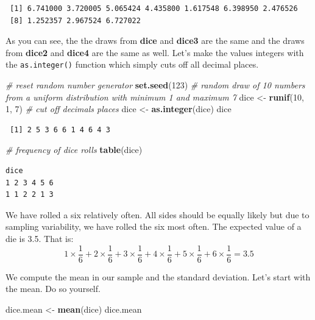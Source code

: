 \documentclass[]{article}
\newenvironment{Shaded}{\begin{snugshade}}{\end{snugshade}}
\newcommand{\CommentTok}[1]{\textcolor[rgb]{0.56,0.35,0.01}{\textit{#1}}}
\newcommand{\DecValTok}[1]{\textcolor[rgb]{0.00,0.00,0.81}{#1}}
\newcommand{\KeywordTok}[1]{\textcolor[rgb]{0.13,0.29,0.53}{\textbf{#1}}}
\newcommand{\NormalTok}[1]{#1}
\newcommand{\StringTok}[1]{\textcolor[rgb]{0.31,0.60,0.02}{#1}}
\begin{document}
\begin{verbatim}
 [1] 6.741000 3.720005 5.065424 4.435800 1.617548 6.398950 2.476526
 [8] 1.252357 2.967524 6.727022
\end{verbatim}

As you can see, the the draws from \textbf{dice} and \textbf{dice3} are the same and the draws from \textbf{dice2} and \textbf{dice4} are the same as well. Let's make the values integers with the \texttt{as.integer()} function which simply cuts off all decimal places.

\begin{Shaded}
\begin{Highlighting}[]
\CommentTok{# reset random number generator}
\KeywordTok{set.seed}\NormalTok{(}\DecValTok{123}\NormalTok{)}
\CommentTok{# random draw of 10 numbers from a uniform distribution with minimum 1 and maximum 7}
\NormalTok{dice <-}\StringTok{ }\KeywordTok{runif}\NormalTok{(}\DecValTok{10}\NormalTok{, }\DecValTok{1}\NormalTok{, }\DecValTok{7}\NormalTok{)}
\CommentTok{# cut off decimals places}
\NormalTok{dice <-}\StringTok{ }\KeywordTok{as.integer}\NormalTok{(dice)}
\NormalTok{dice}
\end{Highlighting}
\end{Shaded}

\begin{verbatim}
 [1] 2 5 3 6 6 1 4 6 4 3
\end{verbatim}

\begin{Shaded}
\begin{Highlighting}[]
\CommentTok{# frequency of dice rolls}
\KeywordTok{table}\NormalTok{(dice)}
\end{Highlighting}
\end{Shaded}

\begin{verbatim}
dice
1 2 3 4 5 6 
1 1 2 2 1 3 
\end{verbatim}

We have rolled a six relatively often. All sides should be equally likely but due to sampling variability, we have rolled the six most often. The expected value of a die is 3.5. That is: \[ 1 \times \frac{1}{6} + 2 \times \frac{1}{6} + 3 \times \frac{1}{6} + 4 \times \frac{1}{6} + 5 \times \frac{1}{6} + 6 \times \frac{1}{6} = 3.5\]

We compute the mean in our sample and the standard deviation. Let's start with the mean. Do so yourself.

\begin{Shaded}
\begin{Highlighting}[]
\NormalTok{dice.mean <-}\StringTok{ }\KeywordTok{mean}\NormalTok{(dice)}
\NormalTok{dice.mean}
\end{Highlighting}
\end{Shaded}
\end{document}
